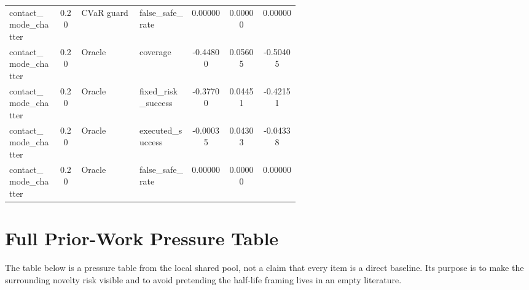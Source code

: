 \documentclass{article}
\begin{document}
\begin{center}
\begin{longtable}{p{0.17\linewidth}cp{0.20\linewidth}p{0.18\linewidth}ccc}
contact\_mode\_chatter & 0.20 & CVaR guard & false\_safe\_rate & 0.00000 & 0.00000 & 0.00000\\
contact\_mode\_chatter & 0.20 & Oracle & coverage & -0.44800 & 0.05605 & -0.50405\\
contact\_mode\_chatter & 0.20 & Oracle & fixed\_risk\_success & -0.37700 & 0.04451 & -0.42151\\
contact\_mode\_chatter & 0.20 & Oracle & executed\_success & -0.00035 & 0.04303 & -0.04338\\
contact\_mode\_chatter & 0.20 & Oracle & false\_safe\_rate & 0.00000 & 0.00000 & 0.00000\\
\bottomrule
\end{longtable}
\normalsize
\end{center}

\section{Full Prior-Work Pressure Table}

The table below is a pressure table from the local shared pool, not a claim that every item is a direct baseline. Its purpose is to make the surrounding novelty risk visible and to avoid pretending the half-life framing lives in an empty literature.
\end{document}
